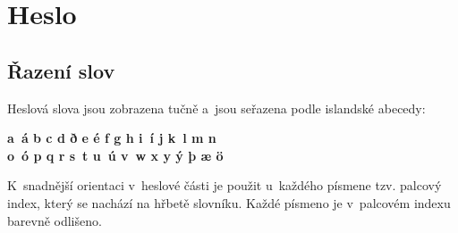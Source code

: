 \def\tableD{\noindent\begin{tabularx}{\columnwidth}{>{\bfseries}lllll}
  \toprule
  \textit{zkratka} & \textit{slovo} & \textit{pád} & \textit{číslo}
    & \specialcell{\textit{předmět}\\\textit{podmět}} \\
  \midrule
  e-að  & eitthvað   & 1. & sg & neživotný \\
  e-ð   & eitthvað   & 4. & sg & neživotný \\
  e-ir  & einhverjir & 1. & pl & životný \\
  e-ja  & einhverja  & 4. & pl & životný \\
  e-jum & einhverjum & 3. & pl & životný \\
  e-m   & einhverjum & 3. & sg & životný \\
  e-n   & einhvern   & 4. & sg & životný \\
  e-r   & einhver    & 1. & sg & životný \\
  e-rra & einhverra  & 2. & pl & životný \\
  e-rs  & einhvers   & 2. & sg & životný \\
  e-s   & einhverns  & 2. & sg & neživotný \\
  e-u   & einhverju  & 3. & sg & neživotný \\
  \bottomrule
  \end{tabularx}
  \captionof{table}{Seznam použitých zkratek neurčitých zájmen}
  \label{table4}}


\section{Heslo}

\subsection*{Řazení slov}

Heslová slova jsou zobrazena tučně a~jsou seřazena podle islandské abecedy:

\blspace
{\bfseries\centering
  a~á b c d ð e é f g h i~í j k~l m n\\
  o~ó p q r s~t u~ú v~w x y ý þ æ ö\par}
\blspace

K~snadnější orientaci v~heslové části je použit u~každého písmene tzv. palcový index, který se nachází na hřbetě slovníku. Každé písmeno je v~palcovém indexu barevně odlišeno.

